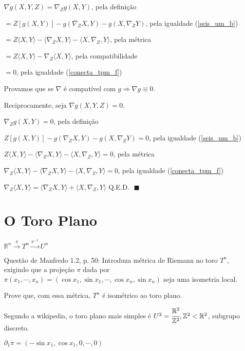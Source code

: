 \documentclass[10pt,a4paper]{article}
\begin{document}
		$\nabla g (X, Y, Z) = \nabla_Z g(X,Y) $, pela defini\c{c}\~ao

		$= Z [g(X, Y)] - g (\nabla_Z X, Y) - g(X, \nabla_Z Y) $, pela igualdade (\ref{seis_um_b})

		$= Z \langle X, Y\rangle - \langle \nabla_Z X, Y \rangle - \langle X, \nabla_Z, Y \rangle $, pela m\'etrica

		$= Z \langle X, Y\rangle - \nabla_Z \langle X, Y \rangle$, pela compatibilidade

		$= 0$, pela igualdade (\ref{conecta_tpm_f})

		Provamos que se $\nabla$ \'e compat\'ivel com $g \Rightarrow \nabla g \equiv 0$.

		Reciprocamente, seja $\nabla g(X,Y,Z) = 0$.

		$\nabla_Z g(X,Y) = 0$, pela defini\c{c}\~ao

		$Z [g(X, Y)] - g (\nabla_Z X, Y) - g(X, \nabla_Z Y) = 0$, pela igualdade (\ref{seis_um_b})

		$Z \langle X, Y\rangle - \langle \nabla_Z X, Y \rangle - \langle X, \nabla_Z, Y \rangle = 0$, pela m\'etrica

		$\nabla_Z \langle X, Y\rangle - \langle \nabla_Z X, Y \rangle - \langle X, \nabla_Z, Y \rangle = 0$, pela igualdade (\ref{conecta_tpm_f})

		$\nabla_Z \langle X, Y\rangle = \langle \nabla_Z X, Y \rangle + \langle X, \nabla_Z, Y \rangle$ Q.E.D. $\,\,\blacksquare$

	\section{O Toro Plano}
		\begin{flushright}
		\end{flushright}

		$\mathbb{R}^n \stackrel{\pi}{\longrightarrow} T^n \stackrel{\pi^{-1}}{\longrightarrow} U^n $

		Quest\~ao de Manfredo 1.2, p. 50: Introduza m\'etrica de Riemann no toro $T^n$, exigindo que a proje\c{c}\~ao $\pi$ dada por $\pi(x_1, \cdots, x_n) = (\cos x_1, \sin x_1, \cdots, \cos x_n, \sin x_n)$ seja uma isometria local.

		Prove que, com essa m\'etrica, $T^n$ \'e isom\'etrico ao toro plano.

		Segundo a wikipedia, o toro plano mais simples \'e $U^2 = \cfrac{\mathbb{R}^2}{\mathbb{Z}^2}, \mathbb{Z}^2 < \mathbb{R}^2$, subgrupo discreto.

		$\partial_1 \pi = (- \sin x_1, \cos x_1, 0, \cdots, 0)$
\end{document}

